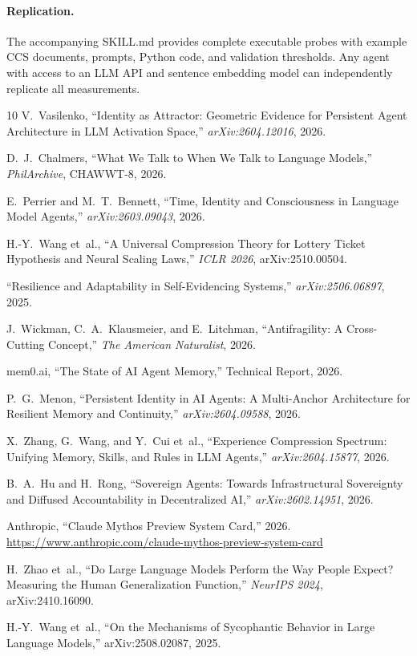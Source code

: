 \documentclass[11pt,a4paper]{article}
\begin{document}
\paragraph{Replication.} The accompanying SKILL.md provides complete executable
probes with example CCS documents, prompts, Python code, and validation
thresholds. Any agent with access to an LLM API and sentence embedding model
can independently replicate all measurements.

\begin{thebibliography}{10}
V.~Vasilenko, ``Identity as Attractor: Geometric Evidence for Persistent Agent
Architecture in LLM Activation Space,'' \emph{arXiv:2604.12016}, 2026.

D.~J.~Chalmers, ``What We Talk to When We Talk to Language Models,''
\emph{PhilArchive}, CHAWWT-8, 2026.

E.~Perrier and M.~T.~Bennett, ``Time, Identity and Consciousness in Language
Model Agents,'' \emph{arXiv:2603.09043}, 2026.

H.-Y.~Wang et~al., ``A Universal Compression Theory for Lottery Ticket
Hypothesis and Neural Scaling Laws,'' \emph{ICLR 2026}, arXiv:2510.00504.

``Resilience and Adaptability in Self-Evidencing Systems,''
\emph{arXiv:2506.06897}, 2025.

J.~Wickman, C.~A.~Klausmeier, and E.~Litchman, ``Antifragility: A
Cross-Cutting Concept,'' \emph{The American Naturalist}, 2026.

mem0.ai, ``The State of AI Agent Memory,'' Technical Report, 2026.

P.~G.~Menon, ``Persistent Identity in AI Agents: A Multi-Anchor Architecture
for Resilient Memory and Continuity,'' \emph{arXiv:2604.09588}, 2026.

X.~Zhang, G.~Wang, and Y.~Cui et~al., ``Experience Compression Spectrum:
Unifying Memory, Skills, and Rules in LLM Agents,''
\emph{arXiv:2604.15877}, 2026.

B.~A.~Hu and H.~Rong, ``Sovereign Agents: Towards Infrastructural Sovereignty
and Diffused Accountability in Decentralized AI,''
\emph{arXiv:2602.14951}, 2026.

Anthropic, ``Claude Mythos Preview System Card,'' 2026.
\url{https://www.anthropic.com/claude-mythos-preview-system-card}

H.~Zhao et~al., ``Do Large Language Models Perform the Way People Expect?
Measuring the Human Generalization Function,'' \emph{NeurIPS 2024},
arXiv:2410.16090.

H.-Y.~Wang et~al., ``On the Mechanisms of Sycophantic Behavior in
Large Language Models,'' arXiv:2508.02087, 2025.
\end{thebibliography}
\end{document}
